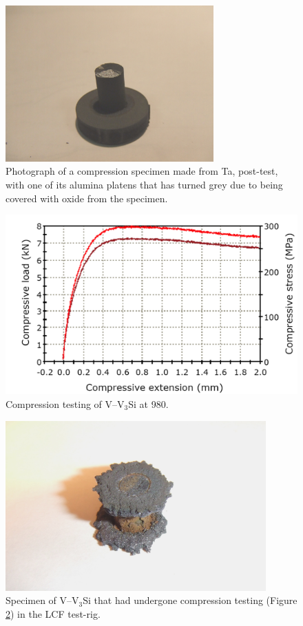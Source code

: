%
\begin{figure}[H]
\begin{center}
\includegraphics[width=8cm]{lcfsantai}
\caption{Photograph of a compression specimen made from  Ta, post-test, with one of its alumina platens that has turned grey due to being covered with oxide from the specimen.}
\label{fig:lcfsantai}
\end{center}
\end{figure}
%
%
\begin{figure}[H]
\begin{center}
\includegraphics[width=12cm]{vcompression}
\caption{Compression testing of V--V$_3$Si at 980\celsius.}
\label{fig:vcompression}
\end{center}
\end{figure}
%
%
\begin{figure}[H]
\begin{center}
\includegraphics[width=10cm]{v_comp_specimen}
\caption{Specimen of V--V$_3$Si that had undergone compression testing (Figure \ref{fig:vcompression}) in the LCF test-rig.}
\label{fig:vspec}
\end{center}
\end{figure}
%



